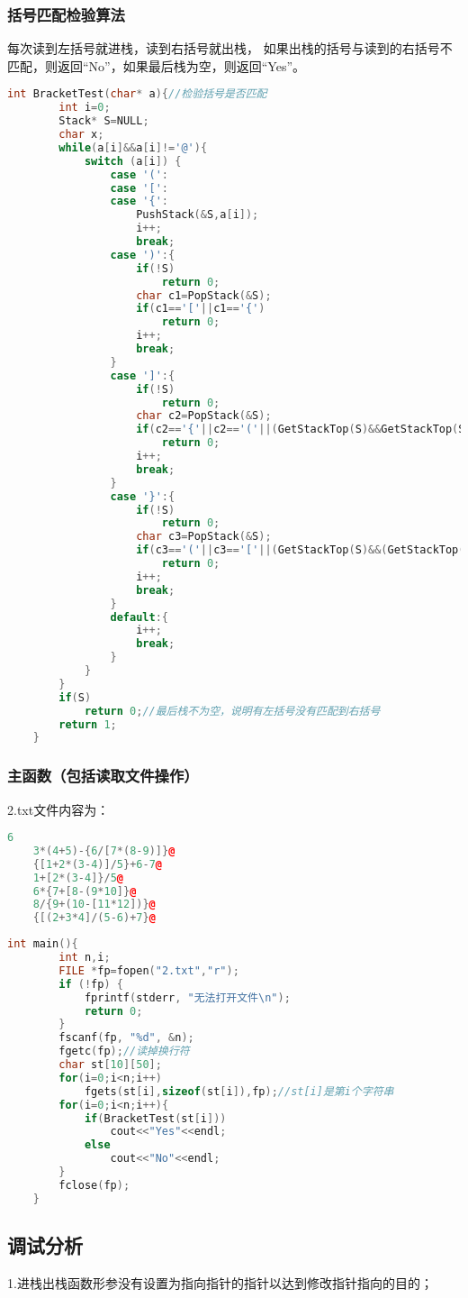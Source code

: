\documentclass{ctexart}
\begin{document}
	\subsubsection{括号匹配检验算法}
	每次读到左括号就进栈，读到右括号就出栈，
	如果出栈的括号与读到的右括号不匹配，则返回“No”，如果最后栈为空，则返回“Yes”。
	\begin{lstlisting}[language=C++, caption=括号匹配检验算法]
		int BracketTest(char* a){//检验括号是否匹配
		int i=0;
		Stack* S=NULL;
		char x;
		while(a[i]&&a[i]!='@'){
			switch (a[i]) {
				case '(':
				case '[':
				case '{':
					PushStack(&S,a[i]);
					i++;			
					break;
				case ')':{
					if(!S)
						return 0;
					char c1=PopStack(&S);
					if(c1=='['||c1=='{')
						return 0;
					i++;	
					break;
				}
				case ']':{
					if(!S)
						return 0;
					char c2=PopStack(&S);
					if(c2=='{'||c2=='('||(GetStackTop(S)&&GetStackTop(S)=='('))//判断优先级
						return 0;
					i++;			
					break;
				}
				case '}':{
					if(!S)
						return 0;
					char c3=PopStack(&S);
					if(c3=='('||c3=='['||(GetStackTop(S)&&(GetStackTop(S)=='('||GetStackTop(S)=='[')))
						return 0;
					i++;			
					break;
				}
				default:{
					i++;
					break;
				}
			}
		}
		if(S)
			return 0;//最后栈不为空，说明有左括号没有匹配到右括号
		return 1;	
	}
	\end{lstlisting}
	\subsubsection{主函数（包括读取文件操作）}
	2.txt文件内容为：
	\begin{lstlisting}[language=C++, caption=2.txt]
	6
	3*(4+5)-{6/[7*(8-9)]}@
	{[1+2*(3-4)]/5}+6-7@
	1+[2*(3-4]}/5@
	6*{7+[8-(9*10]}@
	8/{9+(10-[11*12])}@
	{[(2+3*4]/(5-6)+7}@
	\end{lstlisting}
	\begin{lstlisting}[language=C++, caption=主函数]
	int main(){
		int n,i;
		FILE *fp=fopen("2.txt","r");
		if (!fp) {
			fprintf(stderr, "无法打开文件\n");
			return 0;
		}
		fscanf(fp, "%d", &n);
		fgetc(fp);//读掉换行符
		char st[10][50];
		for(i=0;i<n;i++)
			fgets(st[i],sizeof(st[i]),fp);//st[i]是第i个字符串
		for(i=0;i<n;i++){
			if(BracketTest(st[i]))
				cout<<"Yes"<<endl;
			else
				cout<<"No"<<endl;	
		}
		fclose(fp);
	}
	\end{lstlisting}
	\subsection{调试分析}
	1.进栈出栈函数形参没有设置为指向指针的指针以达到修改指针指向的目的；
\end{document}
